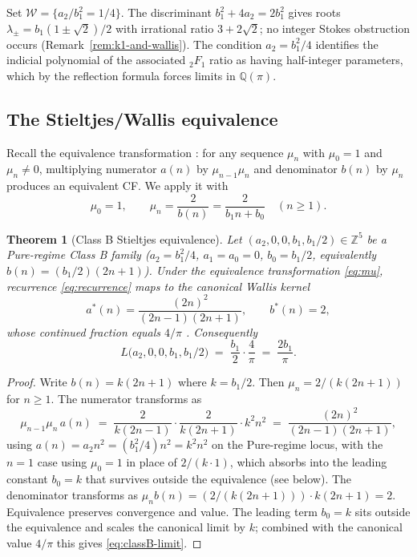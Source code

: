 \documentclass[11pt,a4paper]{article}
\newtheorem{theorem}{Theorem}
\theoremstyle{definition}
\begin{document}
Set $\mathcal{W} = \{a_2/b_1^2 = 1/4\}$. The discriminant $b_1^2+4a_2 = 2b_1^2$ gives roots $\lambda_\pm = b_1(1\pm\sqrt{2})/2$ with irrational ratio $3+2\sqrt{2}$; no integer Stokes obstruction occurs (Remark~\ref{rem:k1-and-wallis}). The condition $a_2 = b_1^2/4$ identifies the indicial polynomial of the associated $_2F_1$ ratio as having half-integer parameters, which by the reflection formula forces limits in $\mathbb{Q}(\pi)$.

\subsection{The Stieltjes/Wallis equivalence}

Recall the equivalence transformation \cite[\S 2.4]{lw1992}: for any sequence $\mu_n$ with $\mu_0=1$ and $\mu_n\ne 0$, multiplying numerator $a(n)$ by $\mu_{n-1}\mu_n$ and denominator $b(n)$ by $\mu_n$ produces an equivalent CF. We apply it with
\begin{equation}\label{eq:mu}
  \mu_0 = 1, \qquad \mu_n = \frac{2}{b(n)} = \frac{2}{b_1 n + b_0} \quad (n\ge 1).
\end{equation}

\begin{theorem}[Class B Stieltjes equivalence]\label{thm:classB-stieltjes}
Let $(a_2, 0, 0, b_1, b_1/2) \in \mathbb{Z}^5$ be a Pure-regime Class B family ($a_2 = b_1^2/4$, $a_1 = a_0 = 0$, $b_0 = b_1/2$, equivalently $b(n) = (b_1/2)(2n+1)$). Under the equivalence transformation \eqref{eq:mu}, recurrence \eqref{eq:recurrence} maps to the canonical Wallis kernel
\begin{equation}\label{eq:wallis-kernel}
  a^*(n) = \frac{(2n)^2}{(2n-1)(2n+1)}, \qquad b^*(n) = 2,
\end{equation}
whose continued fraction equals $4/\pi$ \cite[\S 92]{wall1948}. Consequently
\begin{equation}\label{eq:classB-limit}
  L\bigl(a_2, 0, 0, b_1, b_1/2\bigr) \;=\; \frac{b_1}{2}\cdot\frac{4}{\pi} \;=\; \frac{2 b_1}{\pi}.
\end{equation}
\end{theorem}

\begin{proof}
Write $b(n) = k(2n+1)$ where $k = b_1/2$. Then $\mu_n = 2/(k(2n+1))$ for $n\ge 1$. The numerator transforms as
\[
  \mu_{n-1}\mu_n\, a(n) \;=\; \frac{2}{k(2n-1)}\cdot\frac{2}{k(2n+1)}\cdot k^2 n^2 \;=\; \frac{(2n)^2}{(2n-1)(2n+1)},
\]
using $a(n) = a_2 n^2 = (b_1^2/4)n^2 = k^2 n^2$ on the Pure-regime locus, with the $n=1$ case using $\mu_0 = 1$ in place of $2/(k\cdot 1)$, which absorbs into the leading constant $b_0 = k$ that survives outside the equivalence (see below). The denominator transforms as $\mu_n b(n) = (2/(k(2n+1)))\cdot k(2n+1) = 2$. Equivalence preserves convergence and value. The leading term $b_0 = k$ sits outside the equivalence and scales the canonical limit by $k$; combined with the canonical value $4/\pi$ this gives \eqref{eq:classB-limit}.
\end{proof}
\end{document}
